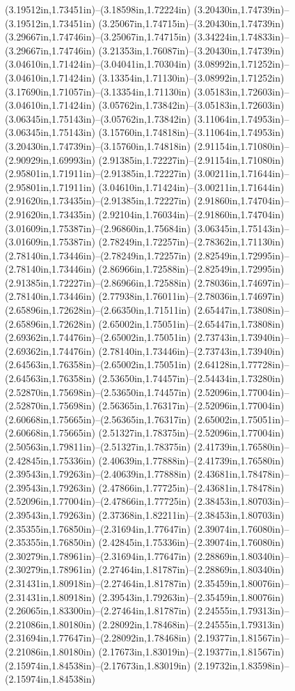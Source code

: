 (3.19512in,1.73451in)--(3.18598in,1.72224in) (3.20430in,1.74739in)--(3.19512in,1.73451in) (3.25067in,1.74715in)--(3.20430in,1.74739in) (3.29667in,1.74746in)--(3.25067in,1.74715in) (3.34224in,1.74833in)--(3.29667in,1.74746in) (3.21353in,1.76087in)--(3.20430in,1.74739in) (3.04610in,1.71424in)--(3.04041in,1.70304in) (3.08992in,1.71252in)--(3.04610in,1.71424in) (3.13354in,1.71130in)--(3.08992in,1.71252in) (3.17690in,1.71057in)--(3.13354in,1.71130in) (3.05183in,1.72603in)--(3.04610in,1.71424in) (3.05762in,1.73842in)--(3.05183in,1.72603in) (3.06345in,1.75143in)--(3.05762in,1.73842in) (3.11064in,1.74953in)--(3.06345in,1.75143in) (3.15760in,1.74818in)--(3.11064in,1.74953in) (3.20430in,1.74739in)--(3.15760in,1.74818in) (2.91154in,1.71080in)--(2.90929in,1.69993in) (2.91385in,1.72227in)--(2.91154in,1.71080in) (2.95801in,1.71911in)--(2.91385in,1.72227in) (3.00211in,1.71644in)--(2.95801in,1.71911in) (3.04610in,1.71424in)--(3.00211in,1.71644in) (2.91620in,1.73435in)--(2.91385in,1.72227in) (2.91860in,1.74704in)--(2.91620in,1.73435in) (2.92104in,1.76034in)--(2.91860in,1.74704in) (3.01609in,1.75387in)--(2.96860in,1.75684in) (3.06345in,1.75143in)--(3.01609in,1.75387in) (2.78249in,1.72257in)--(2.78362in,1.71130in) (2.78140in,1.73446in)--(2.78249in,1.72257in) (2.82549in,1.72995in)--(2.78140in,1.73446in) (2.86966in,1.72588in)--(2.82549in,1.72995in) (2.91385in,1.72227in)--(2.86966in,1.72588in) (2.78036in,1.74697in)--(2.78140in,1.73446in) (2.77938in,1.76011in)--(2.78036in,1.74697in) (2.65896in,1.72628in)--(2.66350in,1.71511in) (2.65447in,1.73808in)--(2.65896in,1.72628in) (2.65002in,1.75051in)--(2.65447in,1.73808in) (2.69362in,1.74476in)--(2.65002in,1.75051in) (2.73743in,1.73940in)--(2.69362in,1.74476in) (2.78140in,1.73446in)--(2.73743in,1.73940in) (2.64563in,1.76358in)--(2.65002in,1.75051in) (2.64128in,1.77728in)--(2.64563in,1.76358in) (2.53650in,1.74457in)--(2.54434in,1.73280in) (2.52870in,1.75698in)--(2.53650in,1.74457in) (2.52096in,1.77004in)--(2.52870in,1.75698in) (2.56365in,1.76317in)--(2.52096in,1.77004in) (2.60668in,1.75665in)--(2.56365in,1.76317in) (2.65002in,1.75051in)--(2.60668in,1.75665in) (2.51327in,1.78375in)--(2.52096in,1.77004in) (2.50563in,1.79811in)--(2.51327in,1.78375in) (2.41739in,1.76580in)--(2.42845in,1.75336in) (2.40639in,1.77888in)--(2.41739in,1.76580in) (2.39543in,1.79263in)--(2.40639in,1.77888in) (2.43681in,1.78478in)--(2.39543in,1.79263in) (2.47866in,1.77725in)--(2.43681in,1.78478in) (2.52096in,1.77004in)--(2.47866in,1.77725in) (2.38453in,1.80703in)--(2.39543in,1.79263in) (2.37368in,1.82211in)--(2.38453in,1.80703in) (2.35355in,1.76850in)--(2.31694in,1.77647in) (2.39074in,1.76080in)--(2.35355in,1.76850in) (2.42845in,1.75336in)--(2.39074in,1.76080in) (2.30279in,1.78961in)--(2.31694in,1.77647in) (2.28869in,1.80340in)--(2.30279in,1.78961in) (2.27464in,1.81787in)--(2.28869in,1.80340in) (2.31431in,1.80918in)--(2.27464in,1.81787in) (2.35459in,1.80076in)--(2.31431in,1.80918in) (2.39543in,1.79263in)--(2.35459in,1.80076in) (2.26065in,1.83300in)--(2.27464in,1.81787in) (2.24555in,1.79313in)--(2.21086in,1.80180in) (2.28092in,1.78468in)--(2.24555in,1.79313in) (2.31694in,1.77647in)--(2.28092in,1.78468in) (2.19377in,1.81567in)--(2.21086in,1.80180in) (2.17673in,1.83019in)--(2.19377in,1.81567in) (2.15974in,1.84538in)--(2.17673in,1.83019in) (2.19732in,1.83598in)--(2.15974in,1.84538in) 